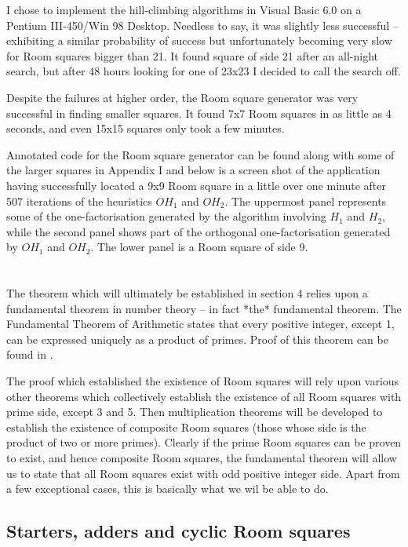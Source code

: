 \documentclass[
  11pt,
  a4paper]{book}\usepackage[]{graphicx}\usepackage[]{xcolor}
\begin{document}
I chose to implement the hill-climbing algorithms in Visual Basic
6.0 on a Pentium III-450/Win 98 Desktop. Needless to say, it was
slightly less successful – exhibiting a similar probability of
success but unfortunately becoming very slow for Room squares
bigger than 21. It found square of side 21 after an all-night
search, but after 48 hours looking for one of 23x23 I decided to
call the search off.

Despite the failures at higher order, the Room square generator
was very successful in finding smaller squares. It found 7x7 Room
squares in as little as 4 seconds, and even 15x15 squares only
took a few minutes.

Annotated code for the Room square generator can be found along
with some of the larger squares in Appendix I and below is a
screen shot of the application having successfully located a 9x9
Room square in a little over one minute after 507 iterations of
the heuristics $OH_1$ and $OH_2$. The uppermost panel represents
some of the one-factorisation generated by the algorithm involving
$H_1$ and $H_2$, while the second panel shows part of the
orthogonal one-factorisation generated by $OH_1$ and $OH_2$. The
lower panel is a Room square of side 9.


\chapter{}

The theorem which will ultimately be established in section
4 relies upon a fundamental theorem in number theory – in
fact *the* fundamental theorem. The Fundamental Theorem of
Arithmetic states that every positive integer, except 1, can
be expressed uniquely as a product of primes. Proof of this
theorem can be found in
\cite{hardyIntroductionTheoryNumbers1979}
.

The proof which established the existence of Room squares
will rely upon various other theorems which collectively
establish the existence of all Room squares with prime side,
except 3 and 5. Then multiplication theorems will be
developed to establish the existence of composite Room
squares (those whose side is the product of two or more
primes). Clearly if the prime Room squares can be proven to
exist, and hence composite Room squares, the fundamental
theorem will allow us to state that all Room squares exist
with odd positive integer side. Apart from a few exceptional
cases, this is basically what we wil be able to do.

\section{Starters, adders and cyclic Room squares}
\end{document}

